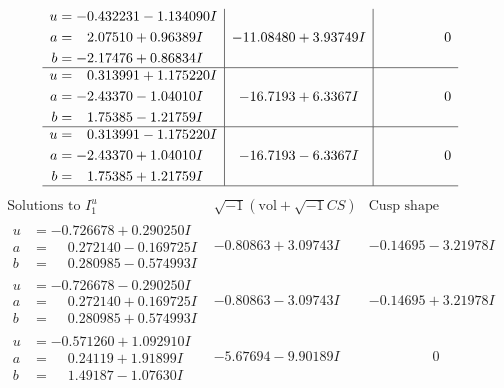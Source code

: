 \documentclass[1p]{elsarticle_modified}
\theoremstyle{definition}
\newcommand{\I}{\sqrt{-1}}
\begin{document}
$$\begin{array}{c|c|c}
\begin{aligned}
u &= -0.432231 - 1.134090 I \\
a &= \phantom{-}2.07510 + 0.96389 I \\
b &= -2.17476 + 0.86834 I\end{aligned}
 & -11.08480 + 3.93749 I & \phantom{-0.000000 } 0 \\ \hline\begin{aligned}
u &= \phantom{-}0.313991 + 1.175220 I \\
a &= -2.43370 - 1.04010 I \\
b &= \phantom{-}1.75385 - 1.21759 I\end{aligned}
 & -16.7193 + 6.3367 I & \phantom{-0.000000 } 0 \\ \hline\begin{aligned}
u &= \phantom{-}0.313991 - 1.175220 I \\
a &= -2.43370 + 1.04010 I \\
b &= \phantom{-}1.75385 + 1.21759 I\end{aligned}
 & -16.7193 - 6.3367 I & \phantom{-0.000000 } 0\\
 \hline 
 \end{array}$$\newpage$$\begin{array}{c|c|c}  
\text{Solutions to }I^u_{1}& \I (\text{vol} + \sqrt{-1}CS) & \text{Cusp shape}\\
 \hline 
\begin{aligned}
u &= -0.726678 + 0.290250 I \\
a &= \phantom{-}0.272140 - 0.169725 I \\
b &= \phantom{-}0.280985 - 0.574993 I\end{aligned}
 & -0.80863 + 3.09743 I & -0.14695 - 3.21978 I \\ \hline\begin{aligned}
u &= -0.726678 - 0.290250 I \\
a &= \phantom{-}0.272140 + 0.169725 I \\
b &= \phantom{-}0.280985 + 0.574993 I\end{aligned}
 & -0.80863 - 3.09743 I & -0.14695 + 3.21978 I \\ \hline\begin{aligned}
u &= -0.571260 + 1.092910 I \\
a &= \phantom{-}0.24119 + 1.91899 I \\
b &= \phantom{-}1.49187 - 1.07630 I\end{aligned}
 & -5.67694 - 9.90189 I & \phantom{-0.000000 } 0 \\ \hline\begin{aligned}

\end{aligned}
\end{array}$$
\end{document}
